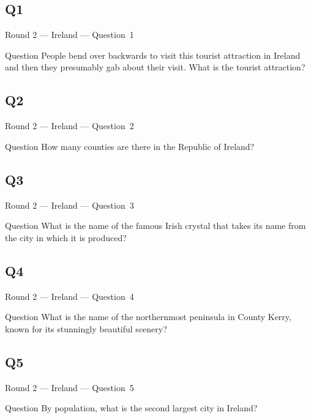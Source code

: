\documentclass[11pt]{beamer}
\begin{document}
\subsection*{Q1}
\begin{frame}[t]{Round 2 --- Ireland --- \mbox{Question 1}}
\vspace{-0.5em}
\begin{block}{Question}
People bend over backwards to visit this tourist attraction in Ireland and then they presumably gab about their visit. What is the tourist attraction?
\end{block}
\end{frame}
\subsection*{Q2}
\begin{frame}[t]{Round 2 --- Ireland --- \mbox{Question 2}}
\vspace{-0.5em}
\begin{block}{Question}
How many counties are there in the Republic of Ireland?
\end{block}
\end{frame}
\subsection*{Q3}
\begin{frame}[t]{Round 2 --- Ireland --- \mbox{Question 3}}
\vspace{-0.5em}
\begin{block}{Question}
What is the name of the famous Irish crystal that takes its name from the city in which it is produced?
\end{block}
\end{frame}
\subsection*{Q4}
\begin{frame}[t]{Round 2 --- Ireland --- \mbox{Question 4}}
\vspace{-0.5em}
\begin{block}{Question}
What is the name of the northernmost peninsula in County Kerry, known for its stunningly beautiful scenery?
\end{block}
\end{frame}
\subsection*{Q5}
\begin{frame}[t]{Round 2 --- Ireland --- \mbox{Question 5}}
\vspace{-0.5em}
\begin{block}{Question}
By population, what is the second largest city in Ireland?
\end{block}
\end{frame}
\end{document}
